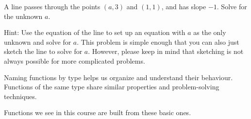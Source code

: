 \documentclass[../main.tex]{subfiles}
\begin{document}
\begin{exercise}
  A line passes through the points \((a,3)\) and \((1,1)\), and has slope \(-1\). Solve for the unknown \(a\).

  {\footnotesize Hint: Use the equation of the line to set up an equation with \(a\) as the only unknown and solve for \(a\). This problem is simple enough that you can also just sketch the line to solve for \(a\). However, please keep in mind that sketching is not always possible for more complicated problems.}

  \blanks*
\end{exercise}
\clearpage

Naming functions by type helps us organize and understand their behaviour. Functions of the same type share similar properties and problem-solving techniques.

Functions we see in this course are built from these basic ones.


\newlength{\ftyperow}
\setlength{\ftyperow}{0.85in}

\newcommand{\ftype}[1]{\parbox[t][\ftyperow][t]{1.25in}{\hlmain{#1}}}
\end{document}
